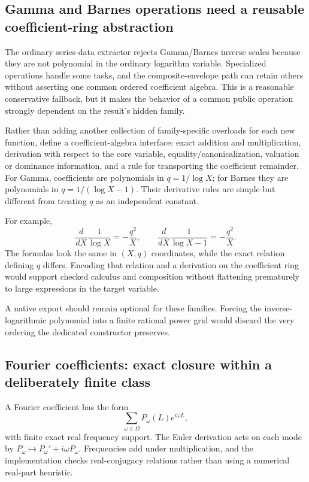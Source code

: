 \documentclass[11pt,a4paper]{article}
\newcommand{\code}[1]{\texttt{\detokenize{#1}}}
\theoremstyle{definition}
\begin{document}
\subsection{Gamma and Barnes operations need a reusable coefficient-ring abstraction}

The ordinary series-data extractor rejects Gamma/Barnes inverse scales because they are not polynomial in the ordinary logarithm variable. Specialized operations handle some tasks, and the composite-envelope path can retain others without asserting one common ordered coefficient algebra. This is a reasonable conservative fallback, but it makes the behavior of a common public operation strongly dependent on the result's hidden family.\cite{operations,guide,envelopes}

Rather than adding another collection of family-specific overloads for each new function, define a coefficient-algebra interface: exact addition and multiplication, derivation with respect to the core variable, equality/canonicalization, valuation or dominance information, and a rule for transporting the coefficient remainder. For Gamma, coefficients are polynomials in $q=1/\log X$; for Barnes they are polynomials in $q=1/(\log X-1)$. Their derivative rules are simple but different from treating $q$ as an independent constant.

For example,
\[
 \frac{d}{dX}\frac1{\log X}=-\frac{q^2}{X},\qquad
 \frac{d}{dX}\frac1{\log X-1}=-\frac{q^2}{X}.
\]
The formulas look the same in $(X,q)$ coordinates, while the exact relation defining $q$ differs. Encoding that relation and a derivation on the coefficient ring would support checked calculus and composition without flattening prematurely to large expressions in the target variable.

A native \code{SeriesData} export should remain optional for these families. Forcing the inverse-logarithmic polynomial into a finite rational power grid would discard the very ordering the dedicated constructor preserves.

\subsection{Fourier coefficients: exact closure within a deliberately finite class}

A Fourier coefficient has the form
\[
 \sum_{\omega\in\Omega}P_\omega(L)e^{i\omega L},
\]
with finite exact real frequency support. The Euler derivation acts on each mode by $P_\omega\mapsto P_\omega'+i\omega P_\omega$. Frequencies add under multiplication, and the implementation checks real-conjugacy relations rather than using a numerical real-part heuristic.\cite{fourier}
\end{document}

